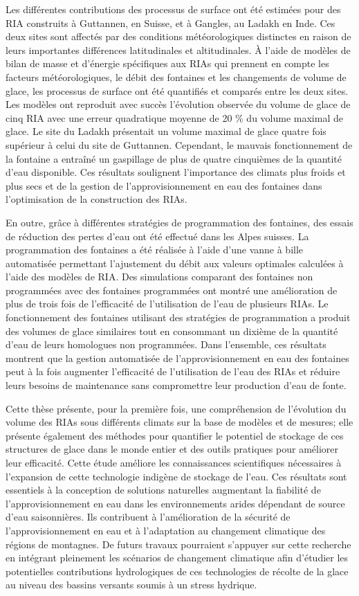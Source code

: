 Les différentes contributions des processus de surface ont été estimées pour des RIA construits à Guttannen, en Suisse, et à Gangles, au Ladakh en Inde. Ces deux sites sont affectés par des conditions météorologiques distinctes en raison de leurs importantes différences latitudinales et altitudinales. À l'aide de modèles de bilan de masse et d'énergie spécifiques aux RIAs qui prennent en compte les facteurs météorologiques, le débit des fontaines et les changements de volume de glace, les processus de surface ont été quantifiés et comparés entre les deux sites. Les modèles ont reproduit avec succès l'évolution observée du volume de glace de cinq RIA avec une erreur quadratique moyenne de 20 \% du volume maximal de glace. Le site du Ladakh présentait un volume maximal de glace quatre fois supérieur à celui du site de Guttannen. Cependant, le mauvais fonctionnement de la fontaine a entraîné un gaspillage de plus de quatre cinquièmes de la quantité d'eau disponible. Ces résultats soulignent l'importance des climats plus froids et plus secs et de la gestion de l'approvisionnement en eau des fontaines dans l'optimisation de la construction des RIAs. 

En outre, grâce à différentes stratégies de programmation des fontaines, des essais de réduction des pertes d'eau ont été effectué dans les Alpes suisses. La programmation des fontaines a été réalisée à l'aide d'une vanne à bille automatisée permettant l’ajustement du débit aux valeurs optimales calculées à l'aide des modèles de RIA. Des simulations comparant des fontaines non programmées avec des fontaines programmées ont montré une amélioration de plus de trois fois de l'efficacité de l'utilisation de l'eau de plusieurs RIAs. Le fonctionnement des fontaines utilisant des stratégies de programmation a produit des volumes de glace similaires tout en consommant un dixième de la quantité d’eau de leurs homologues non programmées. Dans l'ensemble, ces résultats montrent que la gestion automatisée de l'approvisionnement en eau des fontaines peut à la fois augmenter l'efficacité de l'utilisation de l'eau des RIAs et réduire leurs besoins de maintenance sans compromettre leur production d'eau de fonte.

Cette thèse présente, pour la première fois, une compréhension de l'évolution du volume des RIAs sous différents climats sur la base de modèles et de mesures; elle présente également des méthodes pour quantifier le potentiel de stockage de ces structures de glace dans le monde entier et des outils pratiques pour améliorer leur efficacité. Cette étude améliore les connaissances scientifiques nécessaires à l'expansion de cette technologie indigène de stockage de l'eau. Ces résultats sont essentiels à la conception de solutions naturelles augmentant la fiabilité de l'approvisionnement en eau dans les environnements arides dépendant de source d’eau saisonnières. Ils contribuent à l’amélioration de la sécurité de l’approvisionnement en eau et à l'adaptation au changement climatique des régions de montagnes. De futurs travaux pourraient s'appuyer sur cette recherche en intégrant pleinement les scénarios de changement climatique afin d’étudier les potentielles contributions hydrologiques de ces technologies de récolte de la glace au niveau des bassins versants soumis à un stress hydrique.